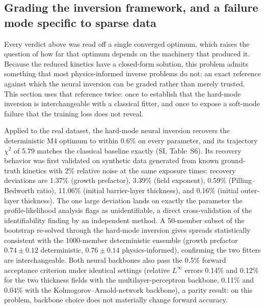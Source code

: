 \documentclass[pdflatex,sn-nature]{sn-jnl}
\begin{document}
\subsection{Grading the inversion framework, and a failure mode specific
to sparse data}\label{sec:pinn}

Every verdict above was read off a single converged optimum, which
raises the question of how far that optimum depends on the machinery
that produced it. Because the reduced kinetics have a closed-form
solution, this problem
admits something that most physics-informed inverse problems do not: an
exact reference against which the neural inversion can be graded rather
than merely trusted. This section uses that reference twice: once to
establish that the hard-mode inversion is interchangeable with a
classical fitter, and once to expose a soft-mode failure that the
training loss does not reveal.

Applied to the real dataset, the hard-mode neural inversion recovers the
deterministic M4 optimum to within 0.6\% on every parameter, and its
trajectory $\chi^2$ of 5.79 matches the classical baseline exactly
(SI, Table~S6). Its recovery behavior was first validated on
synthetic data generated from known ground-truth kinetics with 2\%
relative noise at the same exposure times: recovery deviations are
1.37\% (growth prefactor), 3.39\% (field exponent), 0.59\%
(Pilling--Bedworth ratio), 11.06\% (initial barrier-layer thickness),
and 0.16\% (initial outer-layer thickness). The one large deviation
lands on exactly the parameter the profile-likelihood analysis flags as
unidentifiable, a direct cross-validation of the identifiability
finding by an independent method. A 50-member subset of the bootstrap
re-solved through the hard-mode inversion gives spreads statistically
consistent with the 1000-member deterministic ensemble (growth
prefactor $0.74 \pm 0.12$ deterministic, $0.76 \pm 0.14$
physics-informed), confirming the two fitters are interchangeable. Both neural backbones
also pass the 0.5\% forward acceptance criterion under identical
settings (relative $L^\infty$ errors 0.14\% and 0.12\% for the two
thickness fields with the multilayer-perceptron backbone, 0.11\% and
0.04\% with the Kolmogorov--Arnold-network backbone), a parity result:
on this problem, backbone choice does not materially change forward
accuracy.
\end{document}
